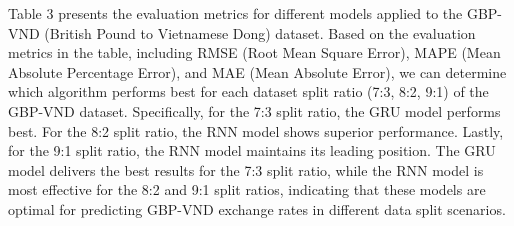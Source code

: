 \documentclass{ieeeojies}
\begin{document}
Table 3 presents the evaluation metrics for different models applied to the GBP-VND (British Pound to Vietnamese Dong) dataset. Based on the evaluation metrics in the table, including RMSE (Root Mean Square Error), MAPE (Mean Absolute Percentage Error), and MAE (Mean Absolute Error), we can determine which algorithm performs best for each dataset split ratio (7:3, 8:2, 9:1) of the GBP-VND dataset. Specifically, for the 7:3 split ratio, the GRU model performs best. For the 8:2 split ratio, the RNN model shows superior performance. Lastly, for the 9:1 split ratio, the RNN model maintains its leading position. The GRU model delivers the best results for the 7:3 split ratio, while the RNN model is most effective for the 8:2 and 9:1 split ratios, indicating that these models are optimal for predicting GBP-VND exchange rates in different data split scenarios.
\end{document}
